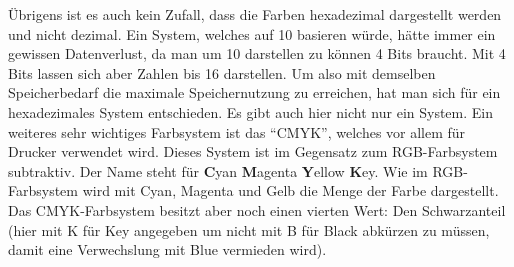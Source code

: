 Übrigens ist es auch kein Zufall, dass die Farben hexadezimal dargestellt werden und nicht dezimal. Ein System, welches auf 10 basieren würde, hätte immer ein gewissen Datenverlust, da man um 10 darstellen zu können 4 Bits braucht. Mit 4 Bits lassen sich aber Zahlen bis 16 darstellen. Um also mit demselben Speicherbedarf die maximale Speichernutzung zu erreichen, hat man sich für ein hexadezimales System entschieden. Es gibt auch hier nicht nur ein System. Ein weiteres sehr wichtiges Farbsystem ist das "`CMYK"', welches vor allem für Drucker verwendet wird. Dieses System ist im Gegensatz zum RGB-Farbsystem subtraktiv. Der Name steht für \textbf{C}yan \textbf{M}agenta \textbf{Y}ellow \textbf{K}ey. Wie im RGB-Farbsystem wird mit Cyan, Magenta und Gelb die Menge der Farbe dargestellt. Das CMYK-Farbsystem besitzt aber noch einen vierten Wert: Den Schwarzanteil (hier mit K für Key angegeben um nicht mit B für Black abkürzen zu müssen, damit eine Verwechslung mit Blue vermieden wird).
